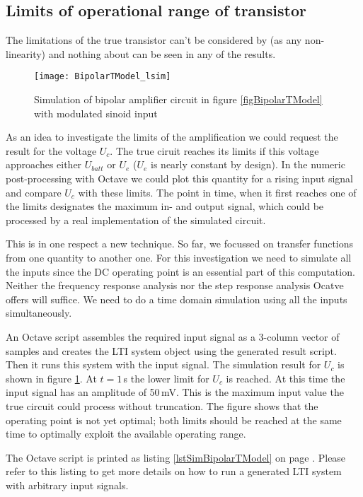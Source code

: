 \subsection{Limits of operational range of transistor}
\label{secTModelOpLimits}

The limitations of the true transistor can't be considered by \linnet{}
(as any non-linearity) and nothing about can be seen in any of the
results.

\begin{figure}
  \centering
  \texttt{[image: BipolarTModel\_lsim]}
  \caption{Simulation of bipolar amplifier circuit in figure
    \ref{figBipolarTModel} with modulated sinoid input
  }
  \label{figBipolarTModel_lsim}
\end{figure}


As an idea to investigate the limits of the amplification we could request
the result for the voltage $U_c$. The true ciruit reaches its limits if
this voltage approaches either $U_{batt}$ or $U_e$ ($U_e$ is nearly
constant by design). In the numeric post-processing with Octave we could
plot this quantity for a rising input signal and compare $U_c$ with
these limits. The point in time, when it first reaches one of the limits
designates the maximum in- and output signal, which could be processed by
a real implementation of the simulated circuit.

This is in one respect a new technique. So far, we focussed on transfer
functions from one quantity to another one. For this investigation we need
to simulate all the inputs since the DC operating point is an essential
part of this computation. Neither the frequency response analysis nor the
step response analysis Ocatve offers will suffice. We need to do a time
domain simulation using all the inputs simultaneously.

An Octave script assembles the required input signal as a 3-column vector
of samples and creates the LTI system object using the \linnet{} generated
result script. Then it runs this system with the input signal. The
simulation result for $U_c$ is shown in figure
\ref{figBipolarTModel_lsim}. At $t=1$\,s the lower limit for $U_c$ is
reached. At this time the input signal has an amplitude of 50\,mV. This is
the maximum input value the true circuit could process without truncation.
The figure shows that the operating point is not yet optimal; both limits
should be reached at the same time to optimally exploit the available
operating range.

The Octave script is printed as listing \ref{lstSimBipolarTModel} on page 
\pageref{secListingOctaveSimulation}. Please refer to this listing to
get more details on how to run a \linnet{} generated LTI system with
arbitrary input signals.

